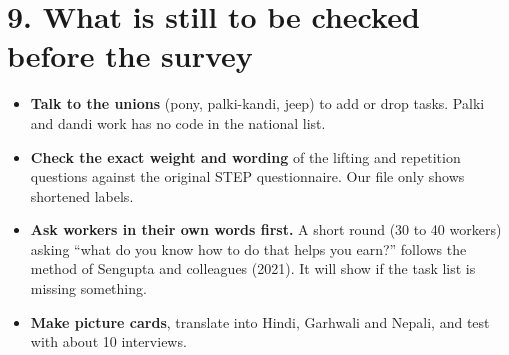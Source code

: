 \documentclass[11pt]{article}
\begin{document}
\section*{9. What is still to be checked before the survey}
\begin{itemize}[leftmargin=1.2em,itemsep=2pt]
\item \textbf{Talk to the unions} (pony, palki-kandi, jeep) to add or drop tasks. Palki and dandi work has no code in the national list.
\item \textbf{Check the exact weight and wording} of the lifting and repetition questions against the original STEP questionnaire. Our file only shows shortened labels.
\item \textbf{Ask workers in their own words first.} A short round (30 to 40 workers) asking ``what do you know how to do that helps you earn?'' follows the method of Sengupta and colleagues (2021). It will show if the task list is missing something.
\item \textbf{Make picture cards}, translate into Hindi, Garhwali and Nepali, and test with about 10 interviews.
\end{itemize}
\end{document}
